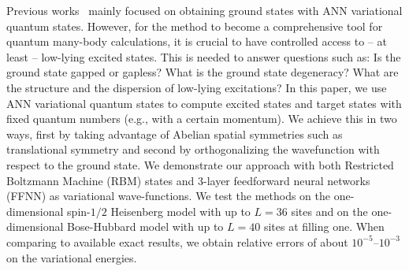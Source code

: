 \documentclass[aps,prl,twocolumn,amsmath,amssymb,superscriptaddress,floatfix]{revtex4-1}
\begin{document}
Previous works~\cite{Carleo2017,Saito2017,NomuraMasatoshi2017,GlasserCiracNN2018,DengLiDasSarma2017,SaitoKato2018} mainly focused on obtaining ground states with ANN variational quantum states. However, for the method to become a comprehensive tool for quantum many-body calculations, it is crucial to have controlled access to -- at least -- low-lying excited states. This is needed to answer questions such as: Is the ground state gapped or gapless? What is the ground state degeneracy? What are the structure and the dispersion of low-lying excitations? 
In this paper, we use ANN variational quantum states to compute excited states and target states with fixed quantum numbers (e.g., with a certain momentum). We achieve this in two ways, first by taking advantage of Abelian spatial symmetries such as translational symmetry and second by orthogonalizing the wavefunction with respect to the ground state. We demonstrate our approach with both Restricted Boltzmann Machine (RBM) states and 3-layer feedforward neural networks (FFNN) as variational wave-functions. 
We test the methods on the one-dimensional spin-$1/2$ Heisenberg model with up to $L=36$ sites and on the one-dimensional Bose-Hubbard model with up to $L=40$ sites at filling one. When comparing to available exact results, we obtain relative errors of about $10^{-5}$--$10^{-3}$ on the variational energies. 
\end{document}
